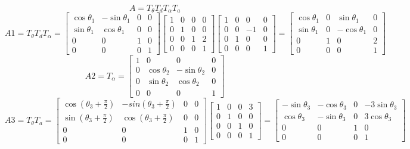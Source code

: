 \documentclass{article}
\begin{document}
\[
A=T_{\theta}T_{d}T_{\alpha}T_{a}
\]
\[
A1=T_{\theta}T_{d}T_{\alpha}
  =
  \begin{bmatrix}
    \cos \theta_{1} & - \sin \theta_{1} & 0 & 0 \\
    \sin \theta_{1} & \cos \theta_{1} & 0 & 0 \\
    0 & 0 & 1 & 0 \\
    0 & 0 & 0 & 1
  \end{bmatrix}
  \begin{bmatrix}
  1 & 0 & 0 & 0 \\
  0 & 1 & 0 & 0 \\
  0 & 0 & 1 & 2 \\
  0 & 0 & 0 & 1
  \end{bmatrix}
  \begin{bmatrix}
  1 & 0 & 0 & 0 \\
  0 & 0 & -1 & 0 \\
  0 & 1 & 0 & 0 \\
  0 & 0 & 0 & 1
  \end{bmatrix}
  =
  \begin{bmatrix}
  \cos \theta_{1} & 0 & \sin \theta_{1} & 0 \\
  \sin \theta_{1} & 0 & - \cos \theta_{1} & 0 \\
  0 & 1 & 0 & 2 \\
  0 & 0 & 0 & 1
  \end{bmatrix}
\]
\[
A2=T_{\alpha}
=
\begin{bmatrix}
1 & 0 & 0 & 0 \\
0 & \cos \theta_{2} & - \sin \theta_{2} & 0 \\
0 & \sin \theta_{2} & \cos \theta_{2} & 0 \\
0 & 0 & 0 & 1
\end{bmatrix}
\]
\[
A3=T_{\theta}T_{a}
=
\begin{bmatrix}
\cos (\theta_{3} + \frac{\pi}{2}) & - sin (\theta_{3} + \frac{\pi}{2}) & 0 & 0 \\
\sin (\theta_{3} + \frac{\pi}{2}) & \cos (\theta_{3} + \frac{\pi}{2}) & 0 & 0 \\
0 & 0 & 1 & 0 \\
0 & 0 & 0 & 1
\end{bmatrix}
\begin{bmatrix}
1 & 0 & 0 & 3 \\
0 & 1 & 0 & 0 \\
0 & 0 & 1 & 0 \\
0 & 0 & 0 & 1
\end{bmatrix}
=
\begin{bmatrix}
- \sin \theta_{3} & - \cos \theta_{3} & 0 & - 3\sin \theta_{3} \\
\cos \theta_{3} & - \sin \theta_{3} & 0 & 3\cos \theta_{3} \\
0 & 0 & 1 & 0 \\
0 & 0 & 0 & 1
\end{bmatrix}
\]
\end{document}
